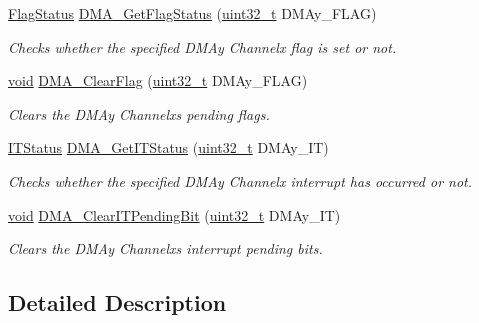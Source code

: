 \begin{DoxyCompactItemize}
\hyperlink{agilefox_2library_2inc_2stm32f10x__type_8h_a89136caac2e14c55151f527ac02daaff}{Flag\+Status} \hyperlink{group___d_m_a___private___functions_gafb30b7a891834c267eefd5d30b688a9f}{D\+M\+A\+\_\+\+Get\+Flag\+Status} (\hyperlink{_p_e___types_8h_a33594304e786b158f3fb30289278f5af}{uint32\+\_\+t} D\+M\+Ay\+\_\+\+F\+L\+AG)
\begin{DoxyCompactList}\small\item\em Checks whether the specified D\+M\+Ay Channelx flag is set or not. \end{DoxyCompactList}\item 
\hyperlink{usb__devapi_8h_afabf60e7f57651d6d595a02c75f07cd0}{void} \hyperlink{group___d_m_a___private___functions_ga25cdca360f309c8ceb7c206cd9ad9119}{D\+M\+A\+\_\+\+Clear\+Flag} (\hyperlink{_p_e___types_8h_a33594304e786b158f3fb30289278f5af}{uint32\+\_\+t} D\+M\+Ay\+\_\+\+F\+L\+AG)
\begin{DoxyCompactList}\small\item\em Clears the D\+M\+Ay Channelx\textquotesingle{}s pending flags. \end{DoxyCompactList}\item 
\hyperlink{agilefox_2library_2inc_2stm32f10x__type_8h_aacbd7ed539db0aacd973a0f6eca34074}{I\+T\+Status} \hyperlink{group___d_m_a___private___functions_ga9287331247150fe84d03ecd7ad8adb52}{D\+M\+A\+\_\+\+Get\+I\+T\+Status} (\hyperlink{_p_e___types_8h_a33594304e786b158f3fb30289278f5af}{uint32\+\_\+t} D\+M\+Ay\+\_\+\+IT)
\begin{DoxyCompactList}\small\item\em Checks whether the specified D\+M\+Ay Channelx interrupt has occurred or not. \end{DoxyCompactList}\item 
\hyperlink{usb__devapi_8h_afabf60e7f57651d6d595a02c75f07cd0}{void} \hyperlink{group___d_m_a___private___functions_ga91a7340e5b334a942f3eb1e05ed5f67a}{D\+M\+A\+\_\+\+Clear\+I\+T\+Pending\+Bit} (\hyperlink{_p_e___types_8h_a33594304e786b158f3fb30289278f5af}{uint32\+\_\+t} D\+M\+Ay\+\_\+\+IT)
\begin{DoxyCompactList}\small\item\em Clears the D\+M\+Ay Channelx\textquotesingle{}s interrupt pending bits. \end{DoxyCompactList}\end{DoxyCompactItemize}


\subsection{Detailed Description}


